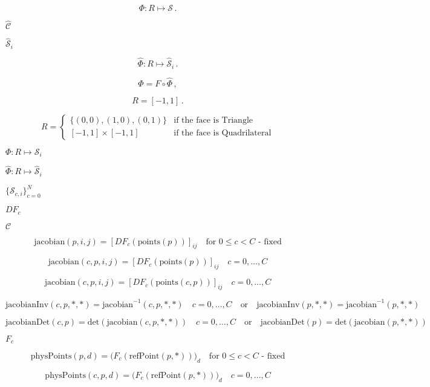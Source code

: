 \documentclass{article}
\begin{document}
\[
    \Phi : R \mapsto \mathcal{S} \,.
\]
\pagebreak

$\mathcal{\hat{C}}$
\pagebreak

$\hat{\mathcal{S}}_i$
\pagebreak

\[
    \hat{\Phi} : R \mapsto \hat{\mathcal{S}}_i \,.
\]
\pagebreak

\[
    \Phi = F\circ \hat{\Phi} \,,
\]
\pagebreak

\[
      R = [-1,1]\,.
\]
\pagebreak

\[
      R = \left\{\begin{array}{rl} 
          \{(0,0),(1,0),(0,1)\} & \mbox{if the face is Triangle} \\[1ex]
            [-1,1]\times [-1,1] & \mbox{if the face is Quadrilateral}
          \end{array}\right.
\]
\pagebreak

$ \Phi : R \mapsto {\mathcal{S}}_i $
\pagebreak

$\hat{\Phi}: R \mapsto \hat{\mathcal{S}}_i$
\pagebreak

$ \{\mathcal{S}_{c,i}\}_{c=0}^N $
\pagebreak

$DF_{c}$
\pagebreak

${\mathcal C}$
\pagebreak

\[ 
        \mbox{jacobian}(p,i,j)   = [DF_{c}(\mbox{points}(p))]_{ij} \quad \mbox{for $0\le c < C$ - fixed} 
\]
\pagebreak

\[
        \mbox{jacobian}(c,p,i,j) = [DF_{c}(\mbox{points}(p))]_{ij} \quad c=0,\ldots, C
\]
\pagebreak

\[ 
        \mbox{jacobian}(c,p,i,j) = [DF_{c}(\mbox{points}(c,p))]_{ij} \quad c=0,\ldots, C
\]
\pagebreak

\[ 
        \mbox{jacobianInv}(c,p,*,*) = \mbox{jacobian}^{-1}(c,p,*,*) \quad c = 0,\ldots, C
        \quad\mbox{or}\quad
        \mbox{jacobianInv}(p,*,*)   = \mbox{jacobian}^{-1}(p,*,*) 
\]
\pagebreak

\[ 
        \mbox{jacobianDet}(c,p) = \mbox{det}(\mbox{jacobian}(c,p,*,*)) \quad c=0,\ldots, C 
        \quad\mbox{or}\quad
        \mbox{jacobianDet}(p)   = \mbox{det}(\mbox{jacobian}(p,*,*)) 
  \]
\pagebreak

$ F_{c} $
\pagebreak

\[  
        \mbox{physPoints}(p,d)   = \Big(F_c(\mbox{refPoint}(p,*)) \Big)_d \quad \mbox{for $0\le c < C$ - fixed}    
\]
\pagebreak

\[
        \mbox{physPoints}(c,p,d) = \Big(F_c(\mbox{refPoint}(p,*)) \Big)_d \quad c=0,\ldots, C 
\]
\pagebreak
\end{document}
